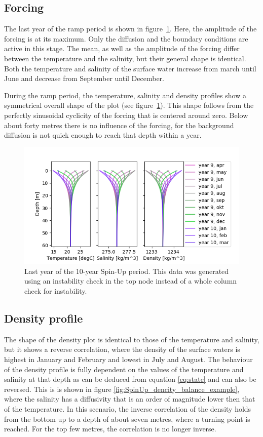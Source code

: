 \documentclass[twocolumn]{article}
\begin{document}
\subsection{Forcing}
The last year of the ramp period is shown in figure~\ref{fig:SpinUp}. Here, the amplitude of the forcing is at its maximum. Only the diffusion and the boundary conditions are active in this stage. 
The mean, as well as the amplitude of the forcing differ between the temperature and the salinity, but their general shape is identical. Both the temperature and salinity of the surface water increase from march until June and decrease from September until December. 

During the ramp period, the temperature, salinity and density profiles show a symmetrical overall shape of the plot (see figure~\ref{fig:SpinUp}). This shape follows from the perfectly sinusoidal cyclicity of the forcing that is centered around zero. Below about forty metres there is no influence of the forcing, for the background diffusion is not quick enough to reach that depth within a year. 

\begin{figure}
\centering
\hspace*{-1.2cm}
\includegraphics[width=1.05\textwidth,keepaspectratio]{SpinUp_year_9.png}
\caption{Last year of the 10-year Spin-Up period. This data was generated using an instability check in the top node instead of a whole column check for instability.}
\label{fig:SpinUp}
\end{figure}
\subsection{Density profile}
The shape of the density plot is identical to those of the temperature and salinity, but it shows a reverse correlation, where the density of the surface waters is highest in January and February and lowest in July and August. 
The behaviour of the density profile is fully dependent on the values of the temperature and salinity at that depth as can be deduced from equation \ref{eq:state} and can also be reversed. This is is shown in figure \ref{fig:SpinUp_dencity_balance_example}, where the salinity has a diffusivity that is an order of magnitude lower then that of the temperature. In this scenario, the inverse correlation of the density holds from the bottom up to a depth of about seven metres, where a turning point is reached. For the top few metres, the correlation is no longer inverse. %
\end{document}

